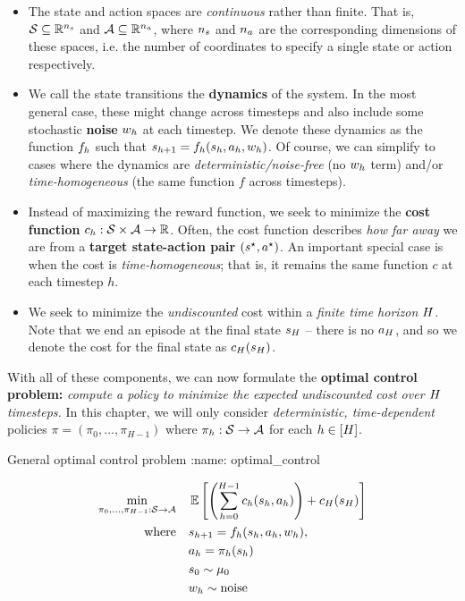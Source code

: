 \documentclass[\main/main]{subfiles}
\begin{document}
\begin{itemize}
    \item The state and action spaces are \emph{continuous} rather than finite. That is, $\mathcal{S} \subseteq \mathbb{R}^{n_s}$ and $\mathcal{A} \subseteq \mathbb{R}^{n_a}$, where $n_s$ and $n_a$ are the corresponding dimensions of these spaces, i.e. the number of coordinates to specify a single state or action respectively.
    \item We call the state transitions the \textbf{dynamics} of the system. In the most general case, these might change across timesteps and also include some stochastic \textbf{noise} $w_h$ at each timestep. We denote these dynamics as the function $f_h$ such that $s_{h+1} = f_h(s_h, a_h, w_h)$. Of course, we can simplify to cases where the dynamics are \emph{deterministic/noise-free} (no $w_h$ term) and/or \emph{time-homogeneous} (the same function $f$ across timesteps).
    \item Instead of maximizing the reward function, we seek to minimize the \textbf{cost function} $c_h: \mathcal{S} \times \mathcal{A} \to \mathbb{R}$. Often, the cost function describes \emph{how far away} we are from a \textbf{target state-action pair} $(s^\star, a^\star)$. An important special case is when the cost is \emph{time-homogeneous}; that is, it remains the same function $c$ at each timestep $h$.
    \item We seek to minimize the \emph{undiscounted} cost within a \emph{finite time horizon} $H$. Note that we end an episode at the final state $s_H$ -- there is no $a_H$, and so we denote the cost for the final state as $c_H(s_H)$.
\end{itemize}

With all of these components, we can now formulate the \textbf{optimal control problem:} \emph{compute a policy to minimize the expected undiscounted cost over $H$ timesteps.} In this chapter, we will only consider \emph{deterministic, time-dependent} policies $\pi = (\pi_0, \dots, \pi_{H-1})$ where $\pi_h : \mathcal{S} \to \mathcal{A}$ for each $h \in [H]$.

\begin{definition}{General optimal control problem}
:name: optimal_control

    \begin{equation}
        \begin{split}
            \min_{\pi_0, \dots, \pi_{H-1} : \mathcal{S} \to \mathcal{A}} \quad & \operatorname*{\mathbb{E}} \left[
                \left( \sum_{h=0}^{H-1} c_h(s_h, a_h) \right) + c_H(s_H)
                \right] \\
            \text{where} \quad & s_{h+1} = f_h(s_h, a_h, w_h), \\
            & a_h = \pi_h(s_h) \\
            & s_0 \sim \mu_0 \\
            & w_h \sim \text{noise}
        \end{split}
    \end{equation}
\end{definition}
\end{document}
